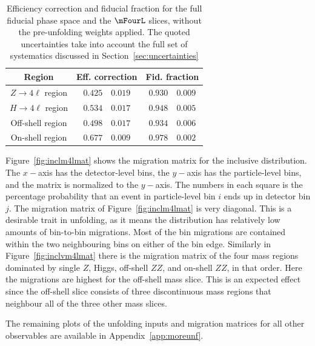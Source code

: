  \begin{table}[ht]
     \centering
     \begin{tabular} { c | r@{$\pm$} l  r@{$\pm$}l }
      \hline
     Region & \multicolumn{2}{c}{Eff. correction}  & \multicolumn{2}{c}{Fid. fraction}   \\
       \hline
       $Z\to 4\ell$ region  & $0.425$ & $0.019$ & $0.930$ & $0.009$ \\
       $H\to 4\ell$ region  & $0.534$ & $0.017$ & $0.948$ & $0.005$ \\
       Off-shell region & $0.498$ & $0.017$ & $0.934$ & $0.006$ \\
       On-shell region  & $0.677$ & $0.009$ & $0.978$ & $0.002$ \\
       \hline
    \end{tabular}
   \caption{Efficiency correction and fiducial fraction for the full fiducial phase space and the $\mFourL$ slices, without the pre-unfolding weights applied. The quoted uncertainties take into account the full set of systematics discussed in Section~\ref{sec:uncertainties} \label{tab:fidxsunf-nopreunfold} }
 \end{table}

Figure~\ref{fig:inclm4lmat} shows the migration matrix for the inclusive \mFourL{} distribution. The $x-$axis has the detector-level bins, the $y-$axis has the particle-level bins, and the matrix is normalized to the $y-$axis. The numbers in each square is the percentage probability that an event in particle-level bin $i$ ends up in detector bin $j$. The migration matrix of Figure~\ref{fig:inclm4lmat} is very diagonal. This is a desirable trait in unfolding, as it means the distribution has relatively low amounts of bin-to-bin migrations. Most of the bin migrations are contained within the two neighbouring bins on either of the bin edge.  Similarly in Figure~\ref{fig:inclvm4lmat} there is the migration matrix of the four mass regions dominated by single $Z$, Higgs,  off-shell $ZZ$, and on-shell $ZZ$, in that order. Here the migrations are highest for the off-shell mass slice. This is an expected effect since the off-shell slice consists of three discontinuous mass regions that neighbour all of the three other mass slices. 

The remaining plots of the unfolding inputs and migration matrices for all other observables are available in Appendix~\ref{app:moreunf}.

